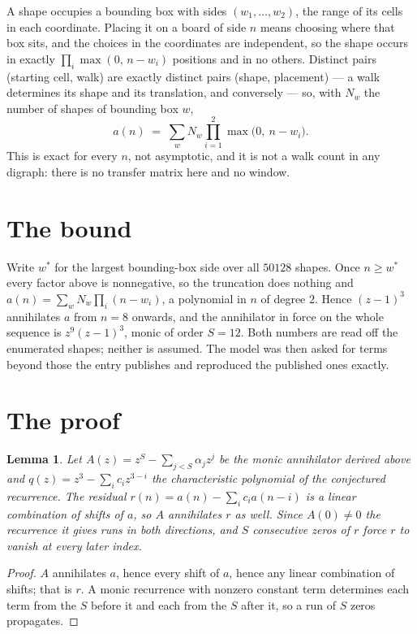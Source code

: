 \documentclass[11pt,a4paper]{article}
\theoremstyle{plain}
\newtheorem{lemma}[theorem]{Lemma}
\theoremstyle{definition}
\begin{document}
A shape occupies a bounding box with sides $(w_1,\dots,w_{2})$, the range of its cells in each
coordinate. Placing it on a board of side $n$ means choosing where that box sits, and the
choices in the coordinates are independent, so the shape occurs in exactly
$\prod_{i}\max(0,\,n-w_i)$ positions and in no others. Distinct pairs (starting cell,
walk) are exactly distinct pairs (shape, placement) --- a walk determines its shape and its
translation, and conversely --- so, with $N_w$ the number of shapes of bounding box $w$,
\[
a(n)\;=\;\sum_{w} N_w \prod_{i=1}^{2}\max\bigl(0,\ n-w_i\bigr).
\]
This is exact for every $n$, not asymptotic, and it is not a walk count in any digraph: there is
no transfer matrix here and no window.

\section{The bound}

Write $w^\ast$ for the largest bounding-box side over all $50128$ shapes. Once $n\ge w^\ast$
every factor above is nonnegative, so the truncation does nothing and
$a(n)=\sum_w N_w\prod_i(n-w_i)$, a polynomial in $n$ of degree $2$. Hence $(z-1)^{3}$
annihilates $a$ from $n=8$ onwards, and the annihilator in force on the whole sequence is
$z^{9}(z-1)^{3}$, monic of order $S=12$. Both numbers are read off the enumerated
shapes; neither is assumed. The model was then asked for terms beyond those the entry publishes
and reproduced the published ones exactly.

\section{The proof}

\begin{lemma}\label{lem:crit}
Let $A(z)=z^S-\sum_{j<S}\alpha_jz^{j}$ be the monic annihilator derived above and
$q(z)=z^{3}-\sum_ic_iz^{3-i}$ the characteristic polynomial of the conjectured
recurrence. The residual $r(n)=a(n)-\sum_ic_ia(n-i)$ is a linear combination of shifts of $a$,
so $A$ annihilates $r$ as well. Since $A(0)\ne0$ the recurrence it gives runs in both
directions, and $S$ consecutive zeros of $r$ force $r$ to vanish at every later index.
\end{lemma}

\begin{proof}
$A$ annihilates $a$, hence every shift of $a$, hence any linear combination of shifts; that is
$r$. A monic recurrence with nonzero constant term determines each term from the $S$ before it
and each from the $S$ after it, so a run of $S$ zeros propagates.
\end{proof}
\end{document}

